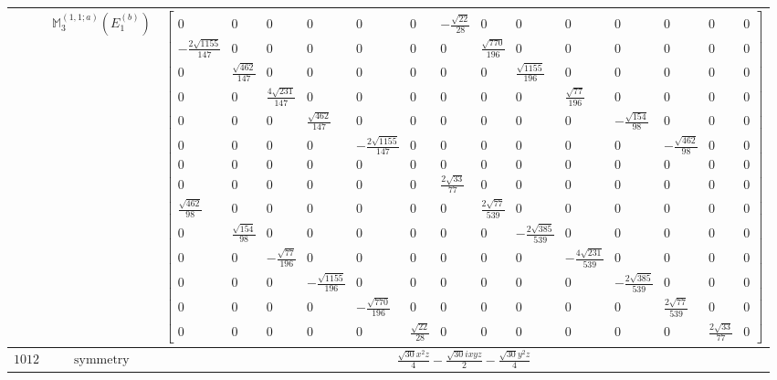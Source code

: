 \documentclass[fleqn,8pt,landscape]{jsarticle}
\begin{document}
\begin{longtable}{ccc}
$  $ & $ \mathbb{M}_{3}^{(1,1;a)}(E_{1}^{(b)}) $ & $ \begin{bmatrix} 0 & 0 & 0 & 0 & 0 & 0 & - \frac{\sqrt{22}}{28} & 0 & 0 & 0 & 0 & 0 & 0 & 0 \\ - \frac{2 \sqrt{1155}}{147} & 0 & 0 & 0 & 0 & 0 & 0 & \frac{\sqrt{770}}{196} & 0 & 0 & 0 & 0 & 0 & 0 \\ 0 & \frac{\sqrt{462}}{147} & 0 & 0 & 0 & 0 & 0 & 0 & \frac{\sqrt{1155}}{196} & 0 & 0 & 0 & 0 & 0 \\ 0 & 0 & \frac{4 \sqrt{231}}{147} & 0 & 0 & 0 & 0 & 0 & 0 & \frac{\sqrt{77}}{196} & 0 & 0 & 0 & 0 \\ 0 & 0 & 0 & \frac{\sqrt{462}}{147} & 0 & 0 & 0 & 0 & 0 & 0 & - \frac{\sqrt{154}}{98} & 0 & 0 & 0 \\ 0 & 0 & 0 & 0 & - \frac{2 \sqrt{1155}}{147} & 0 & 0 & 0 & 0 & 0 & 0 & - \frac{\sqrt{462}}{98} & 0 & 0 \\ 0 & 0 & 0 & 0 & 0 & 0 & 0 & 0 & 0 & 0 & 0 & 0 & 0 & 0 \\ 0 & 0 & 0 & 0 & 0 & 0 & \frac{2 \sqrt{33}}{77} & 0 & 0 & 0 & 0 & 0 & 0 & 0 \\ \frac{\sqrt{462}}{98} & 0 & 0 & 0 & 0 & 0 & 0 & \frac{2 \sqrt{77}}{539} & 0 & 0 & 0 & 0 & 0 & 0 \\ 0 & \frac{\sqrt{154}}{98} & 0 & 0 & 0 & 0 & 0 & 0 & - \frac{2 \sqrt{385}}{539} & 0 & 0 & 0 & 0 & 0 \\ 0 & 0 & - \frac{\sqrt{77}}{196} & 0 & 0 & 0 & 0 & 0 & 0 & - \frac{4 \sqrt{231}}{539} & 0 & 0 & 0 & 0 \\ 0 & 0 & 0 & - \frac{\sqrt{1155}}{196} & 0 & 0 & 0 & 0 & 0 & 0 & - \frac{2 \sqrt{385}}{539} & 0 & 0 & 0 \\ 0 & 0 & 0 & 0 & - \frac{\sqrt{770}}{196} & 0 & 0 & 0 & 0 & 0 & 0 & \frac{2 \sqrt{77}}{539} & 0 & 0 \\ 0 & 0 & 0 & 0 & 0 & \frac{\sqrt{22}}{28} & 0 & 0 & 0 & 0 & 0 & 0 & \frac{2 \sqrt{33}}{77} & 0 \end{bmatrix} $ \\ \hline
$ 1012 $ & $ \text{symmetry} $ & $ \frac{\sqrt{30} x^{2} z}{4} - \frac{\sqrt{30} i x y z}{2} - \frac{\sqrt{30} y^{2} z}{4} $ \\

\end{longtable}
\end{document}
